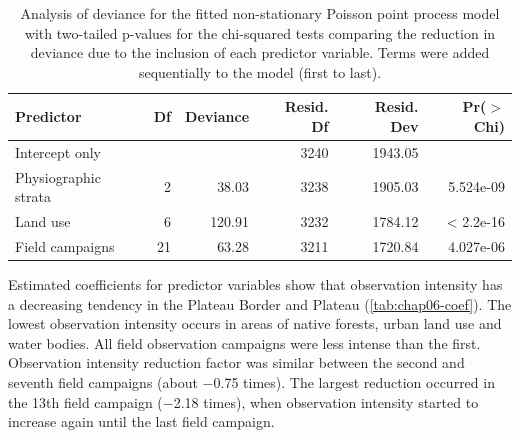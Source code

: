 \begin{table}[!ht]
 \caption{Analysis of deviance for the fitted non-stationary Poisson point process model with two-tailed 
 p-values for the chi-squared tests comparing the reduction in deviance due to the inclusion of each predictor 
 variable. Terms were added sequentially to the model (first to last).}
 \label{tab:deviance}
 \centering\footnotesize
 \begin{tabular}{lrrrrr}
  \hline
  Predictor		& Df	& Deviance	& Resid. Df	& Resid. Dev	& Pr($>$Chi)	\\ 
  \hline
  Intercept only	&  	&  		& 3240 		& 1943.05 	&  		\\ 
  Physiographic strata	& 2 	& 38.03 	& 3238 		& 1905.03 	& 5.524e-09 	\\ 
  Land use		& 6 	& 120.91 	& 3232 		& 1784.12 	& < 2.2e-16 	\\ 
  Field campaigns	& 21 	& 63.28 	& 3211 		& 1720.84 	& 4.027e-06 	\\ 
  \hline
 \end{tabular}
\end{table}

Estimated coefficients for predictor variables show that observation intensity has a decreasing tendency in the
Plateau Border and Plateau (\autoref{tab:chap06-coef}). The lowest observation intensity occurs in areas of 
native forests, urban land use and water bodies. All field observation campaigns were less intense than the 
first. Observation intensity reduction factor was similar between the second and seventh field campaigns 
(about \num{-0.75} times). The largest reduction occurred in the \num{13}th field campaign (\num{-2.18} times), 
when observation intensity started to increase again until the last field campaign.

